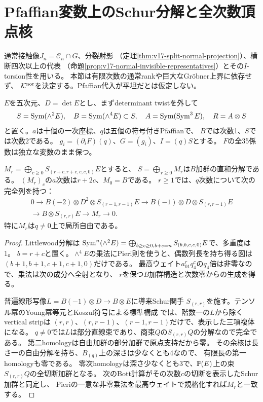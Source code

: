 \section{Pfaffian変数上のSchur分解と全次数頂点核}
\label{sec:pf-vertex-structure}
通常接触像$J_n=\mathcal C_n\cap G$、分裂射影
（定理\ref{thm:v17-split-normal-projection}）、横断四次以上の代表
（命題\ref{prop:v17-normal-invisible-representatives}）とその$I$-torsion性を用いる。
本節は有限次数の通常rankや巨大なGr\"obner上界に依存せず、
$\mathcal K^{\rm nor}$を決定する。Pfaffian代入が平坦だとは仮定しない。

$E$を五次元、$D=\det E$とし、まずdeterminant twistを外して
\[
 S=\operatorname{Sym}(\wedge^2E),\quad B=\operatorname{Sym}(\wedge^4E)\subset S,
 \quad A=\operatorname{Sym}(\operatorname{Sym}^3E),\quad R=A\otimes S
\]
と置く。$a$は十個の一次座標、$q$は五個の符号付きPfaffianで、
$B$では次数1、$S$では次数2である。
$g_i=(\partial_iF)(q)$、$G=(g_i)$、$I=(q)S$とする。
$F$の全35係数は独立な変数のまま保つ。

\begin{proposition}[Pfaffian係数環上の直和と線形分解]
\label{prop:pf-schur-resolution}
$M_r=\bigoplus_{c\ge0}S_{(r+c,r+c,c,c,0)}E$とすると、
$S=\bigoplus_{r\ge0}M_r$は$B$加群の直和分解である。
$(M_r)_c$の$a$次数は$r+2c$、$M_0=B$である。
$r\ge1$では、$q$次数について次の完全列を持つ：
\begin{multline*}
0\longrightarrow B(-2)\otimes D^2\otimes S_{(r-1,r-1)}E
 \longrightarrow B(-1)\otimes D\otimes S_{(r,r-1)}E\\
 \longrightarrow B\otimes S_{(r,r)}E\longrightarrow M_r\longrightarrow0.
\end{multline*}
特に$M_r$は$q\ne0$上で局所自由である。
\end{proposition}
\begin{proof}
Littlewood分解\cite[\S2.1, (2.2)]{PfRWW}は
$\operatorname{Sym}^n(\wedge^2E)=\bigoplus_{b\ge c\ge0,b+c=n}S_{(b,b,c,c,0)}E$で、多重度は1。
$b=r+c$と置く。$\wedge^4E$の乗法にPieri則を使うと、偶数列長を持ち得る図は
$(b+1,b+1,c+1,c+1,0)$だけである。
最高ウェイト$a_{01}^rq_4^c$の$q_4$倍は非零なので、乗法は次の成分へ全射となり、
$r$を保つ$B$加群構造と次数零からの生成を得る。

普遍線形写像$L=B(-1)\otimes D\to B\otimes E$に導来Schur関手
$S_{(r,r)}$を施す。テンソル冪のYoung冪等元とKoszul符号による標準構成
\cite[Chapter 2]{PfWeyman}では、階数一の$L$から除くvertical stripは
$(r,r)$、$(r,r-1)$、$(r-1,r-1)$だけで、表示した三項複体になる。
$q\ne0$では$L$は部分直線束であり、商束$Q$の$S_{(r,r)}Q$の分解なので完全である。
第二homologyは自由加群の部分加群で原点支持だから零。
その余核は長さ一の自由分解を持ち、$B_{(q)}$上の深さは少なくとも4なので、
有限長の第一homologyも零である。
零次homologyは深さ少なくとも3で、$\mathbb P(E)$上の束$S_{(r,r)}Q$の全切断加群となる。
次のBott計算がその次数$c$の切断を表示したSchur加群と同定し、
Pieriの一意な非零乗法を最高ウェイトで規格化すれば$M_r$と一致する。
\end{proof}

